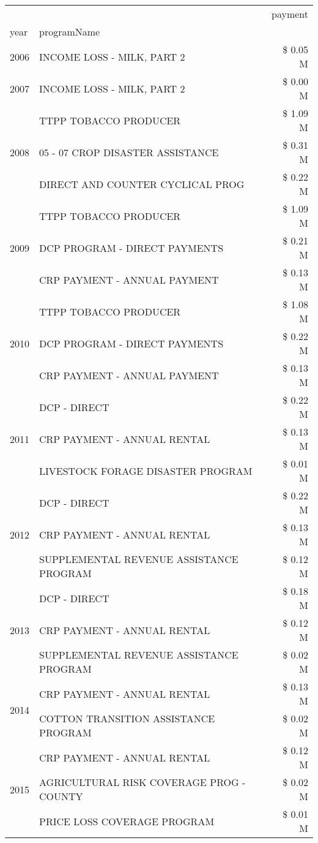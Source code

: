 \begin{tabular}{llr}
\toprule
 &  & payment \\
year & programName &  \\
\midrule
2006 & INCOME LOSS - MILK, PART 2 & \$ 0.05 M \\
\cline{1-3}
2007 & INCOME LOSS - MILK, PART 2 & \$ 0.00 M \\
\cline{1-3}
\multirow[t]{3}{*}{2008} & TTPP TOBACCO PRODUCER & \$ 1.09 M \\
 & 05 - 07 CROP DISASTER ASSISTANCE & \$ 0.31 M \\
 & DIRECT AND COUNTER CYCLICAL PROG & \$ 0.22 M \\
\cline{1-3}
\multirow[t]{3}{*}{2009} & TTPP TOBACCO PRODUCER & \$ 1.09 M \\
 & DCP PROGRAM - DIRECT PAYMENTS & \$ 0.21 M \\
 & CRP PAYMENT - ANNUAL PAYMENT & \$ 0.13 M \\
\cline{1-3}
\multirow[t]{3}{*}{2010} & TTPP TOBACCO PRODUCER & \$ 1.08 M \\
 & DCP PROGRAM - DIRECT PAYMENTS & \$ 0.22 M \\
 & CRP PAYMENT - ANNUAL PAYMENT & \$ 0.13 M \\
\cline{1-3}
\multirow[t]{3}{*}{2011} & DCP - DIRECT & \$ 0.22 M \\
 & CRP PAYMENT - ANNUAL RENTAL & \$ 0.13 M \\
 & LIVESTOCK FORAGE DISASTER PROGRAM & \$ 0.01 M \\
\cline{1-3}
\multirow[t]{3}{*}{2012} & DCP - DIRECT & \$ 0.22 M \\
 & CRP PAYMENT - ANNUAL RENTAL & \$ 0.13 M \\
 & SUPPLEMENTAL REVENUE ASSISTANCE PROGRAM & \$ 0.12 M \\
\cline{1-3}
\multirow[t]{3}{*}{2013} & DCP - DIRECT & \$ 0.18 M \\
 & CRP PAYMENT - ANNUAL RENTAL & \$ 0.12 M \\
 & SUPPLEMENTAL REVENUE ASSISTANCE PROGRAM & \$ 0.02 M \\
\cline{1-3}
\multirow[t]{2}{*}{2014} & CRP PAYMENT - ANNUAL RENTAL & \$ 0.13 M \\
 & COTTON TRANSITION ASSISTANCE PROGRAM & \$ 0.02 M \\
\cline{1-3}
\multirow[t]{3}{*}{2015} & CRP PAYMENT - ANNUAL RENTAL & \$ 0.12 M \\
 & AGRICULTURAL RISK COVERAGE PROG - COUNTY & \$ 0.02 M \\
 & PRICE LOSS COVERAGE PROGRAM & \$ 0.01 M \\

\end{tabular}
